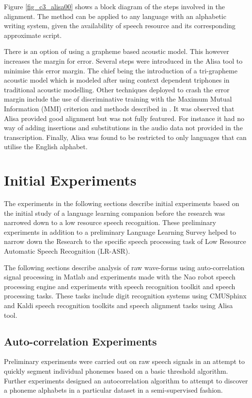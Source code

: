 Figure \ref{fig_c3_alisa00} shows a block diagram of the steps involved in the alignment.  The method can be applied to any language with an alphabetic writing system, given the availability of speech resource and its corresponding approximate script.

There is an option of using a grapheme based acoustic model. This however increases the margin for error.  Several steps were introduced in the Alisa tool to minimise this error margin. The chief being the introduction of a tri-grapheme acoustic model which is modeled after using context dependent triphones in traditional acoustic modelling.  Other techniques deployed to crash the error margin include the use of discriminative training with the Maximum Mutual Information (MMI) criterion \citep{schluter2001model} and methods described in \citep{novotney2009analysis}. It was observed that Alisa provided good alignment but was not fully featured. For instance it had no way of adding insertions and substitutions in the audio data not provided in the transcription.  Finally, Alisa was found to be restricted to only languages that can utilise the English alphabet.

\section{Initial Experiments}
The experiments in the following sections describe initial experiments based on the initial study of a language learning companion before the research was narrowed down to a low resource speech recognition.  These preliminary experiments in addition to a preliminary Language Learning Survey helped to narrow down the Research to the specific speech processing task of Low Resource Automatic Speech Recognition (LR-ASR).

The following sections describe analysis of raw wave-forms using auto-correlation signal processing in Matlab and experiments made with the Nao robot speech processing engine and experiments with speech recognition toolkit and speech processing tasks.  These tasks include digit recognition systems using CMUSphinx and Kaldi speech recognition toolkits and speech alignment tasks using Alisa tool.

\subsection{Auto-correlation Experiments}
Preliminary experiments were carried out on raw speech signals in an attempt to quickly segment individual phonemes based on a basic threshold algorithm.  Further experiments designed an autocorrelation algorithm to attempt to discover a phoneme alphabets in a particular dataset in a semi-supervised fashion.
 
